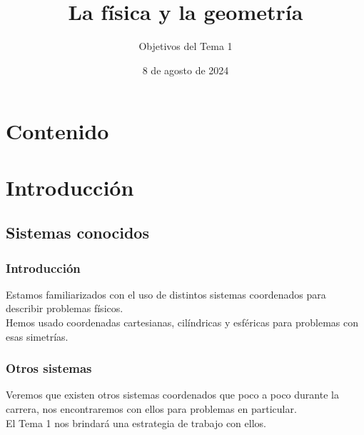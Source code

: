 \documentclass[12pt]{beamer}
\date{8 de agosto de 2024}
\title{La física y la geometría}
\subtitle{Objetivos del Tema 1}
\begin{document}
\maketitle
\fontsize{14}{14}\selectfont
{}

\section*{Contenido}

\section{Introducción}
\subsection{Sistemas conocidos}

\begin{frame}
\frametitle{Introducción}
Estamos familiarizados con el uso de distintos sistemas coordenados para describir problemas físicos.
\\
\bigskip
\pause
Hemos usado coordenadas cartesianas, cilíndricas y esféricas para problemas con esas simetrías.
\end{frame}
\begin{frame}
\frametitle{Otros sistemas}
Veremos que existen otros sistemas coordenados que poco a poco durante la carrera, nos encontraremos con ellos para problemas en particular.
\\
\bigskip
\pause
El Tema 1 nos brindará una estrategia de trabajo con ellos.
\end{frame}

\end{document}
